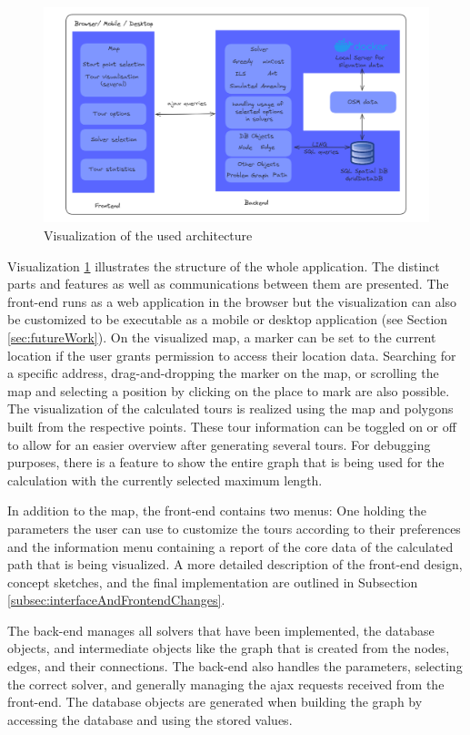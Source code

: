 \begin{figure}
	\includegraphics[width=1.1\textwidth]{bilder/Implementation Architecture.png}
	\caption{Visualization of the used architecture}
	\label{fig:architecture}
\end{figure}


Visualization \ref{fig:architecture} illustrates the structure of the whole application. 
The distinct parts and features as well as communications between them are presented. 
The front-end runs as a web application in the browser but the visualization can also be customized to be executable as a mobile or desktop application (see Section \ref{sec:futureWork}). 
On the visualized map, a marker can be set to the current location if the user grants permission to access their location data.
Searching for a specific address, drag-and-dropping the marker on the map, or scrolling the map and selecting a position by clicking on the place to mark are also possible. 
The visualization of the calculated tours is realized using the map and polygons built from the respective points.
These tour information can be toggled on or off to allow for an easier overview after generating several tours.
For debugging purposes, there is a feature to show the entire graph that is being used for the calculation with the currently selected maximum length.

In addition to the map, the front-end contains two menus:
One holding the parameters the user can use to customize the tours according to their preferences and the information menu containing a report of the core data of the calculated path that is being visualized. 
A more detailed description of the front-end design, concept sketches, and the final implementation are outlined in Subsection \ref{subsec:interfaceAndFrontendChanges}.

The back-end manages all solvers that have been implemented, the database objects, and intermediate objects like the graph that is created from the nodes, edges, and their connections. 
The back-end also handles the parameters, selecting the correct solver, and generally managing the ajax requests received from the front-end. 
The database objects are generated when building the graph by accessing the database and using the stored values.

